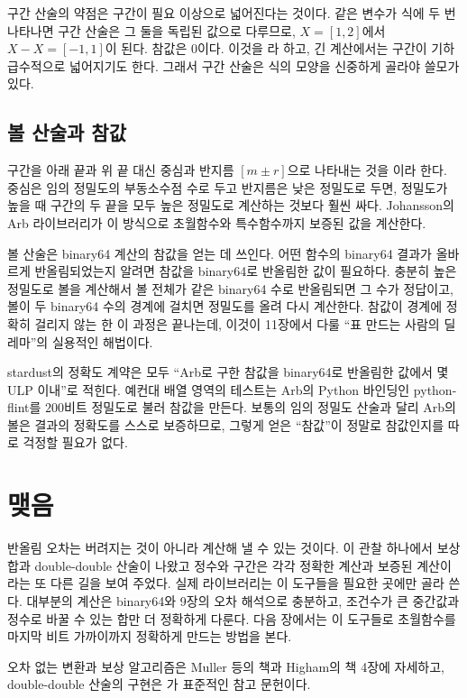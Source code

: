 구간 산술의 약점은 구간이 필요 이상으로 넓어진다는 것이다. 같은 변수가 식에 두 번 나타나면 구간 산술은 그 둘을 독립된 값으로 다루므로, $X=[1,2]$에서 $X-X=[-1,1]$이 된다. 참값은 $0$이다. 이것을 라 하고, 긴 계산에서는 구간이 기하급수적으로 넓어지기도 한다. 그래서 구간 산술은 식의 모양을 신중하게 골라야 쓸모가 있다.

\subsection{볼 산술과 참값}

구간을 아래 끝과 위 끝 대신 중심과 반지름 $[m\pm r]$으로 나타내는 것을 이라 한다. 중심은 임의 정밀도의 부동소수점 수로 두고 반지름은 낮은 정밀도로 두면, 정밀도가 높을 때 구간의 두 끝을 모두 높은 정밀도로 계산하는 것보다 훨씬 싸다. Johansson의 Arb 라이브러리가 이 방식으로 초월함수와 특수함수까지 보증된 값을 계산한다\cite{johansson2017arb}.

볼 산술은 binary64 계산의 참값을 얻는 데 쓰인다. 어떤 함수의 binary64 결과가 올바르게 반올림되었는지 알려면 참값을 binary64로 반올림한 값이 필요하다. 충분히 높은 정밀도로 볼을 계산해서 볼 전체가 같은 binary64 수로 반올림되면 그 수가 정답이고, 볼이 두 binary64 수의 경계에 걸치면 정밀도를 올려 다시 계산한다. 참값이 경계에 정확히 걸리지 않는 한 이 과정은 끝나는데, 이것이 11장에서 다룰 ``표 만드는 사람의 딜레마''의 실용적인 해법이다.

\begin{instardust}
stardust의 정확도 계약은 모두 ``Arb로 구한 참값을 binary64로 반올림한 값에서 몇 ULP 이내''로 적힌다. 예컨대 배열 영역의 테스트는 Arb의 Python 바인딩인 python-flint를 $200$비트 정밀도로 불러 참값을 만든다. 보통의 임의 정밀도 산술과 달리 Arb의 볼은 결과의 정확도를 스스로 보증하므로, 그렇게 얻은 ``참값''이 정말로 참값인지를 따로 걱정할 필요가 없다.
\end{instardust}

\section{맺음}

반올림 오차는 버려지는 것이 아니라 계산해 낼 수 있는 것이다. 이 관찰 하나에서 보상 합과 double-double 산술이 나왔고 정수와 구간은 각각 정확한 계산과 보증된 계산이라는 또 다른 길을 보여 주었다. 실제 라이브러리는 이 도구들을 필요한 곳에만 골라 쓴다. 대부분의 계산은 binary64와 9장의 오차 해석으로 충분하고, 조건수가 큰 중간값과 정수로 바꿀 수 있는 합만 더 정확하게 다룬다. 다음 장에서는 이 도구들로 초월함수를 마지막 비트 가까이까지 정확하게 만드는 방법을 본다.

오차 없는 변환과 보상 알고리즘은 Muller 등의 책\cite{muller2018handbook}과 Higham의 책\cite{higham2002accuracy} 4장에 자세하고, double-double 산술의 구현은 \cite{hida2001qd}가 표준적인 참고 문헌이다.

\chapterreferences
